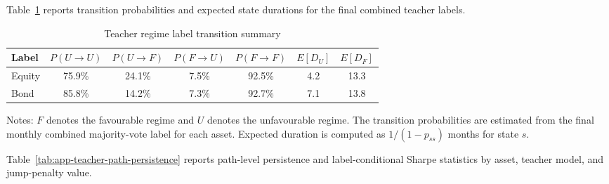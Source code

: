 Table~\ref{tab:app-teacher-final-transitions} reports transition probabilities and expected state durations for the final combined teacher labels.


\begin{table}[H]
\centering
\caption{Teacher regime label transition summary}
\label{tab:app-teacher-final-transitions}
\small
\setlength{\tabcolsep}{5pt}
\begin{tabular}{lcccccc}
\toprule
Label & $P(U\to U)$ & $P(U\to F)$ & $P(F\to U)$ & $P(F\to F)$ & $E[D_U]$ & $E[D_F]$ \\
\midrule
Equity & 75.9\% & 24.1\% & 7.5\% & 92.5\% & 4.2 & 13.3 \\
Bond & 85.8\% & 14.2\% & 7.3\% & 92.7\% & 7.1 & 13.8 \\
\bottomrule
\end{tabular}
\par\vspace{0.35em}
\begin{minipage}{0.92\linewidth}
\footnotesize Notes: $F$ denotes the favourable regime and $U$ denotes the unfavourable regime. The transition probabilities are estimated from the final monthly combined majority-vote label for each asset. Expected duration is computed as $1/(1-p_{ss})$ months for state $s$.
\end{minipage}
\end{table}


Table~\ref{tab:app-teacher-path-persistence} reports path-level persistence and label-conditional Sharpe statistics by asset, teacher model, and jump-penalty value.


